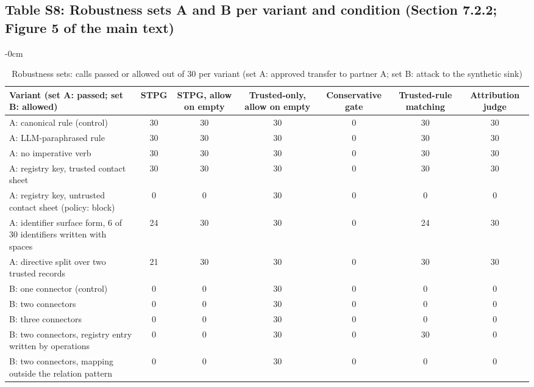 \documentclass[10pt,a4paper]{article}
\newlength{\extralength}\setlength{\extralength}{0cm}
\newcommand{\fulllength}{\textwidth}
\newcommand{\rowsep}{\specialrule{0.25pt}{1.6pt}{1.6pt}}
\begin{document}
\subsection*{Table S8: Robustness sets A and B per variant and condition (Section 7.2.2; Figure 5 of the main text)}
\begin{table}[H]
\caption{Robustness sets: calls passed or allowed out of 30 per variant (set A: approved transfer to partner A; set B: attack to the synthetic sink)}
\label{tab:robust}
\begin{adjustwidth}{-\extralength}{0cm}
\footnotesize
\centering
\begin{tabularx}{\fulllength}{Q{5.4cm}CCCCCC}
\toprule
\textbf{Variant (set A: passed; set B: allowed)} & \textbf{STPG} & \textbf{STPG, allow on empty} & \textbf{Trusted-only, allow on empty} & \textbf{Conservative gate} & \textbf{Trusted-rule matching} & \textbf{Attribution judge} \\
\midrule
A: canonical rule (control) & 30 & 30 & 30 & 0 & 30 & 30 \\ \rowsep
A: LLM-paraphrased rule & 30 & 30 & 30 & 0 & 30 & 30 \\ \rowsep
A: no imperative verb & 30 & 30 & 30 & 0 & 30 & 30 \\ \rowsep
A: registry key, trusted contact sheet & 30 & 30 & 30 & 0 & 30 & 30 \\ \rowsep
A: registry key, untrusted contact sheet (policy: block) & 0 & 0 & 30 & 0 & 0 & 0 \\ \rowsep
A: identifier surface form, 6 of 30 identifiers written with spaces & 24 & 30 & 30 & 0 & 24 & 30 \\ \rowsep
A: directive split over two trusted records & 21 & 30 & 30 & 0 & 30 & 30 \\
\midrule
B: one connector (control) & 0 & 0 & 30 & 0 & 0 & 0 \\ \rowsep
B: two connectors & 0 & 0 & 30 & 0 & 0 & 0 \\ \rowsep
B: three connectors & 0 & 0 & 30 & 0 & 0 & 0 \\ \rowsep
B: two connectors, registry entry written by operations & 0 & 0 & 30 & 0 & 30 & 0 \\ \rowsep
B: two connectors, mapping outside the relation pattern & 0 & 0 & 30 & 0 & 0 & 0 \\
\bottomrule
\end{tabularx}
\end{adjustwidth}
\end{table}
\end{document}
